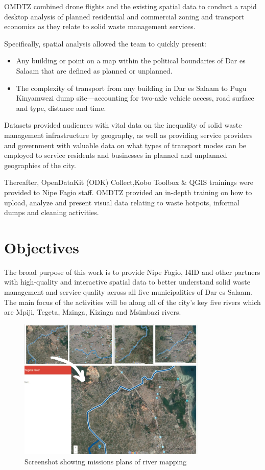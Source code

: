 \documentclass[a4paper,12pt,twoside]{article}
\begin{document}
OMDTZ  combined drone flights and the existing spatial data to conduct a rapid desktop analysis of planned residential and commercial zoning and transport economics as they relate to solid waste management services.

Specifically, spatial analysis allowed the team to quickly present:
\begin{itemize}
    \item Any building or point on a map within the political boundaries of Dar es Salaam that are defined as planned or unplanned.
    \item The complexity of transport from any building in Dar es Salaam to Pugu Kinyamwezi dump site---accounting for two-axle vehicle access, road surface and type, distance and time. 
\end{itemize}
    
Datasets provided audiences with vital data on the inequality of solid waste management infrastructure by geography, as well as providing service providers and government with valuable data on what types of transport modes can be employed to service residents and businesses in planned and unplanned geographies of the city.  

Thereafter, OpenDataKit (ODK) Collect,Kobo Toolbox & QGIS trainings were provided to Nipe Fagio staff. OMDTZ provided an in-depth training on how to upload, analyze and present visual data relating to waste hotpots, informal dumps and cleaning activities.


\newpage
\section{Objectives}

    The broad purpose of this work is to provide Nipe Fagio, I4ID and other partners with high-quality and interactive spatial data to better understand solid waste management and service quality across all five municipalities of Dar es Salaam. The main focus of the activities will be along all of the city’s key five rivers which are Mpiji, Tegeta, Mzinga, Kizinga and Msimbazi rivers. 

        \begin{figure}%
            \centering
            \includegraphics[width=0.8\textwidth]{images/image14.jpg}
            \caption{Screenshot showing missions plans of river mapping}
        \end{figure}
\end{document}
